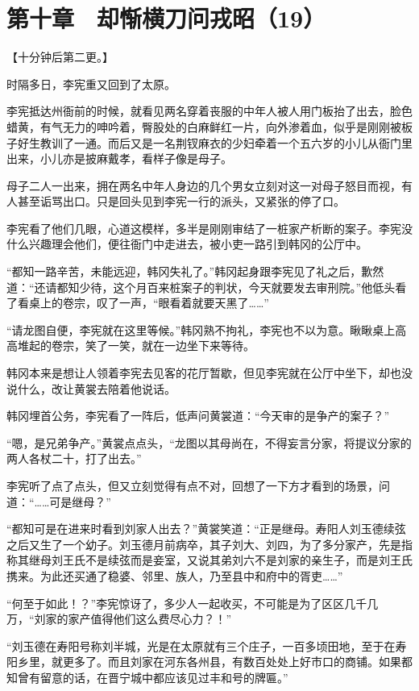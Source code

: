 \section{第十章　却惭横刀问戎昭（19）}

【十分钟后第二更。】

时隔多日，李宪重又回到了太原。

李宪抵达州衙前的时候，就看见两名穿着丧服的中年人被人用门板抬了出去，脸色蜡黄，有气无力的呻吟着，臀股处的白麻鲜红一片，向外渗着血，似乎是刚刚被板子好生教训了一通。而后又是一名荆钗麻衣的少妇牵着一个五六岁的小儿从衙门里出来，小儿亦是披麻戴孝，看样子像是母子。

母子二人一出来，拥在两名中年人身边的几个男女立刻对这一对母子怒目而视，有人甚至诟骂出口。只是回头见到李宪一行的派头，又紧张的停了口。

李宪看了他们几眼，心道这模样，多半是刚刚审结了一桩家产析断的案子。李宪没什么兴趣理会他们，便往衙门中走进去，被小吏一路引到韩冈的公厅中。

“都知一路辛苦，未能远迎，韩冈失礼了。”韩冈起身跟李宪见了礼之后，歉然道：“还请都知少待，这个月百来桩案子的判状，今天就要发去审刑院。”他低头看了看桌上的卷宗，叹了一声，“眼看着就要天黑了……”

“请龙图自便，李宪就在这里等候。”韩冈熟不拘礼，李宪也不以为意。瞅瞅桌上高高堆起的卷宗，笑了一笑，就在一边坐下来等待。

韩冈本来是想让人领着李宪去见客的花厅暂歇，但见李宪就在公厅中坐下，却也没说什么，改让黄裳去陪着他说话。

韩冈埋首公务，李宪看了一阵后，低声问黄裳道：“今天审的是争产的案子？”

“嗯，是兄弟争产。”黄裳点点头，“龙图以其母尚在，不得妄言分家，将提议分家的两人各杖二十，打了出去。”

李宪听了点了点头，但又立刻觉得有点不对，回想了一下方才看到的场景，问道：“……可是继母？”

“都知可是在进来时看到刘家人出去？”黄裳笑道：“正是继母。寿阳人刘玉德续弦之后又生了一个幼子。刘玉德月前病卒，其子刘大、刘四，为了多分家产，先是指称其继母刘王氏不是续弦而是妾室，又说其弟刘六不是刘家的亲生子，而是刘王氏携来。为此还买通了稳婆、邻里、族人，乃至县中和府中的胥吏……”

“何至于如此！？”李宪惊讶了，多少人一起收买，不可能是为了区区几千几万，“刘家的家产值得他们这么费尽心力？！”

“刘玉德在寿阳号称刘半城，光是在太原就有三个庄子，一百多顷田地，至于在寿阳乡里，就更多了。而且刘家在河东各州县，有数百处处上好市口的商铺。如果都知曾有留意的话，在晋宁城中都应该见过丰和号的牌匾。”

